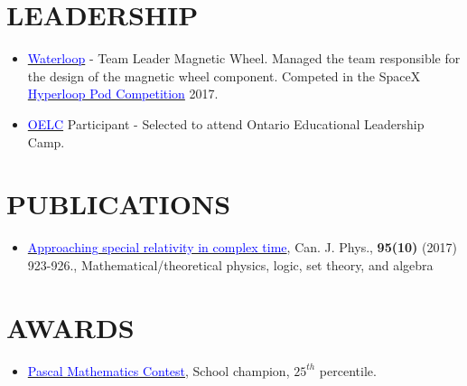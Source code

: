 \documentclass[margin]{res}
\begin{document}
\begin{resume}
	\section{\textcolor{NavyBlue}{LEADERSHIP}}
	\begin{itemize} \itemsep -2pt %
		\item \href{https://teamwaterloop.ca/}{\textcolor{blue}{Waterloop}} - Team Leader Magnetic Wheel. Managed the team responsible for the design of the magnetic wheel component. Competed in the SpaceX \href{https://en.wikipedia.org/wiki/Hyperloop_pod_competition}{\textcolor{blue}{Hyperloop Pod Competition}} 2017.
		\item \href{https://www.oelccaso.com/}{\textcolor{blue}{OELC}} Participant - Selected to attend Ontario Educational Leadership Camp.
	\end{itemize}

	\section{\textcolor{NavyBlue}{PUBLICATIONS}}
	\begin{itemize}
		\item \href{https://www.nrcresearchpress.com/doi/abs/10.1139/cjp-2017-0089?journalCode=cjp#.X3Z1_GhKiUk}{\textcolor{blue}{Approaching special relativity in complex time}}, Can. J. Phys., \textbf{95(10)} (2017) 923-926., Mathematical/theoretical physics, logic, set theory, and algebra
	\end{itemize}

	\section{\textcolor{NavyBlue}{AWARDS}}
	\begin{itemize}
		\item 	\href{https://www.cemc.uwaterloo.ca/contests/pcf.html}{\textcolor{blue}{Pascal Mathematics Contest}}, School champion, $25^{th}$ percentile.
	\end{itemize}
\end{resume}
\end{document}
